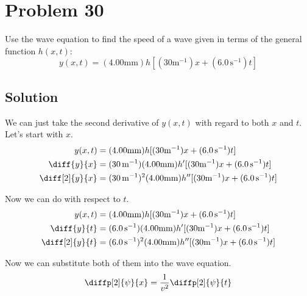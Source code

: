 \documentclass[12pt]{article}
\begin{document}
    \pagebreak
    \section{Problem 30}
        Use the wave equation to find the speed of a wave given in terms of the general function $h(x, t)$:
        \begin{equation}
            y(x, t) = (4.00 \unit{\milli\meter}) h[(30 \unit{\meter^{-1}})x + (6.0\,\unit{\second^{-1}})t]
        \end{equation}

        \subsection{Solution}
            We can just take the second derivative of $y(x,t)$ with regard to both $x$ and $t$.
            Let's start with $x$.
            \begin{align}
                y(x,t)  &=  (4.00 \unit{\milli\meter}) h[(30 \unit{\meter^{-1}})x + (6.0\,\unit{\second^{-1}})t]\\
                \diff{y}{x}    &=  (30\,\unit{\meter^{-1}}) (4.00 \unit{\milli\meter}) h'[(30 \unit{\meter^{-1}})x + (6.0\,\unit{\second^{-1}})t]\\
                \diff[2]{y}{x} &=  (30\,\unit{\meter^{-1}})^2 (4.00 \unit{\milli\meter}) h''[(30 \unit{\meter^{-1}})x + (6.0\,\unit{\second^{-1}})t]
            \end{align}

            Now we can do with respect to $t$.
            \begin{align}
                y(x,t)  &=  (4.00 \unit{\milli\meter}) h[(30 \unit{\meter^{-1}})x + (6.0\,\unit{\second^{-1}})t]\\
                \diff{y}{t}    &=  (6.0\,\unit{\second^{-1}}) (4.00 \unit{\milli\meter}) h'[(30 \unit{\meter^{-1}})x + (6.0\,\unit{\second^{-1}})t]\\
                \diff[2]{y}{t}  &=  (6.0\,\unit{\second^{-1}})^2 (4.00 \unit{\milli\meter}) h''[(30 \unit{\meter^{-1}})x + (6.0\,\unit{\second^{-1}})t]
            \end{align}

            Now we can substitute both of them into the wave equation.
            \begin{equation}
                \diffp[2]{\psi}{x}  =   \frac{1}{v^2} \diffp[2]{\psi}{t}
            \end{equation}
\end{document}
